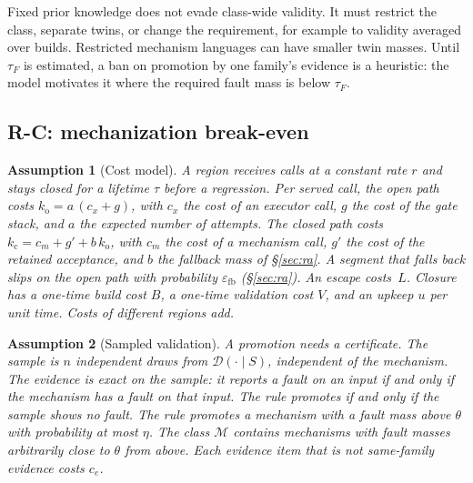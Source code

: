 \documentclass[11pt]{article}
\newtheorem{assumption}{Assumption}
\theoremstyle{definition}
\theoremstyle{remark}
\newcommand{\D}{\mathcal{D}}
\newcommand{\Mclass}{\mathcal{M}}
\begin{document}
Fixed prior knowledge does not evade class-wide validity.
It must restrict the class, separate twins, or change the requirement, for example to validity
averaged over builds. Restricted mechanism languages can have smaller twin masses.
Until $\tau_F$ is estimated, a ban on promotion by one family's evidence is a heuristic:
the model motivates it where the required fault mass is below $\tau_F$.

\subsection{R-C: mechanization break-even}\label{sec:rc}
\begin{assumption}[Cost model]\label{ass:cost}
A region receives calls at a constant rate $r$ and stays closed for a lifetime $\tau$ before a
regression. Per served call, the open path costs $k_{\mathrm{o}}=a\,(c_x+g)$, with $c_x$ the cost of an
executor call, $g$ the cost of the gate stack, and $a$ the expected number of attempts. The closed
path costs $k_{\mathrm{c}}=c_m+g'+b\,k_{\mathrm{o}}$, with $c_m$ the cost of a mechanism call, $g'$ the
cost of the retained acceptance, and $b$ the fallback mass of \S\ref{sec:ra}. A segment that falls
back slips on the open path with probability $\varepsilon_{\mathrm{fb}}$ (\S\ref{sec:ra}). An escape
costs~$L$.
Closure has a one-time build cost $B$, a one-time validation cost $V$, and an upkeep $u$ per unit
time. Costs of different regions add.
\end{assumption}

\begin{assumption}[Sampled validation]\label{ass:sampled}
A promotion needs a \emph{certificate}. The sample is $n$ independent draws from $\D(\cdot\mid S)$,
independent of the mechanism. The evidence is exact on the sample: it reports a fault on an input if
and only if the mechanism has a fault on that input. The rule promotes if and only if the sample
shows no fault. The rule promotes a mechanism with a fault mass above $\theta$ with probability at
most $\eta$. The class $\Mclass$ contains mechanisms with fault masses arbitrarily close to $\theta$
from above. Each evidence item
that is not same-family evidence costs $c_e$.
\end{assumption}
\end{document}
